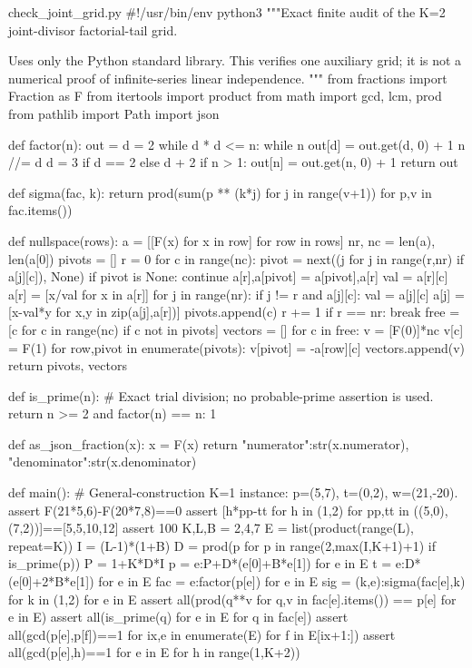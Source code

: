 \begin{filecontents*}[overwrite]{check_joint_grid.py}
#!/usr/bin/env python3
"""Exact finite audit of the K=2 joint-divisor factorial-tail grid.

Uses only the Python standard library.  This verifies one auxiliary grid;
it is not a numerical proof of infinite-series linear independence.
"""
from fractions import Fraction as F
from itertools import product
from math import gcd, lcm, prod
from pathlib import Path
import json


def factor(n):
    out = {}
    d = 2
    while d * d <= n:
        while n %
            out[d] = out.get(d, 0) + 1
            n //= d
        d = 3 if d == 2 else d + 2
    if n > 1:
        out[n] = out.get(n, 0) + 1
    return out


def sigma(fac, k):
    return prod(sum(p ** (k*j) for j in range(v+1)) for p,v in fac.items())


def nullspace(rows):
    a = [[F(x) for x in row] for row in rows]
    nr, nc = len(a), len(a[0])
    pivots = []
    r = 0
    for c in range(nc):
        pivot = next((j for j in range(r,nr) if a[j][c]), None)
        if pivot is None:
            continue
        a[r],a[pivot] = a[pivot],a[r]
        val = a[r][c]
        a[r] = [x/val for x in a[r]]
        for j in range(nr):
            if j != r and a[j][c]:
                val = a[j][c]
                a[j] = [x-val*y for x,y in zip(a[j],a[r])]
        pivots.append(c)
        r += 1
        if r == nr:
            break
    free = [c for c in range(nc) if c not in pivots]
    vectors = []
    for c in free:
        v = [F(0)]*nc
        v[c] = F(1)
        for row,pivot in enumerate(pivots):
            v[pivot] = -a[row][c]
        vectors.append(v)
    return pivots, vectors


def is_prime(n):
    # Exact trial division; no probable-prime assertion is used.
    return n >= 2 and factor(n) == {n: 1}


def as_json_fraction(x):
    x = F(x)
    return {"numerator":str(x.numerator), "denominator":str(x.denominator)}


def main():
    # General-construction K=1 instance: p=(5,7), t=(0,2), w=(21,-20).
    assert F(21*5,6)-F(20*7,8)==0
    assert [h*pp-tt for h in (1,2) for pp,tt in ((5,0),(7,2))]==[5,5,10,12]
    assert 100%
    K,L,B = 2,4,7
    E = list(product(range(L), repeat=K))
    I = (L-1)*(1+B)
    D = prod(p for p in range(2,max(I,K+1)+1) if is_prime(p))
    P = 1+K*D*I
    p = {e:P+D*(e[0]+B*e[1]) for e in E}
    t = {e:D*(e[0]+2*B*e[1]) for e in E}
    fac = {e:factor(p[e]) for e in E}
    sig = {(k,e):sigma(fac[e],k) for k in (1,2) for e in E}
    assert all(prod(q**v for q,v in fac[e].items()) == p[e] for e in E)
    assert all(is_prime(q) for e in E for q in fac[e])
    assert all(gcd(p[e],p[f])==1 for ix,e in enumerate(E) for f in E[ix+1:])
    assert all(gcd(p[e],h)==1 for e in E for h in range(1,K+2))


\end{filecontents*}
